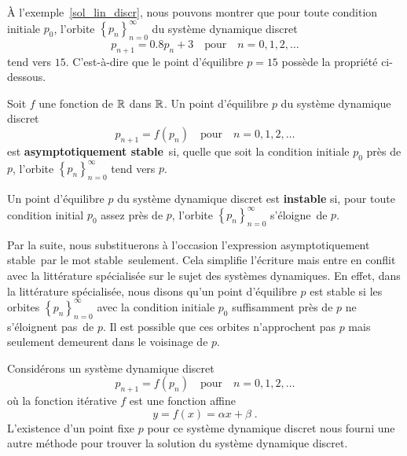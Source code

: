 {\begin{egg}
À l'exemple~\ref{sol_lin_discr}, nous pouvons montrer que pour toute
condition initiale $p_0$, l'orbite
$\displaystyle \left\{ p_n\right\}_{n=0}^\infty$ du 
système dynamique discret
\[
p_{n+1}=0.8 p_n +3 \quad \text{pour} \quad n=0, 1, 2, \ldots
\]
tend vers $15$.  C'est-à-dire que le point d'équilibre $p=15$ possède
la propriété ci-dessous.
\end{egg}

\begin{defn}
Soit $f$ une fonction de $\mathbb{R}$ dans $\mathbb{R}$.  Un point d'équilibre $p$ du
système dynamique discret
\[
p_{n+1} = f(p_n) \quad \text{pour} \quad n=0, 1, 2, \ldots
\]
est {\bfseries asymptotiquement stable}\footnotemark\ si, quelle que soit la
condition initiale $p_0$ près de $p$, l'orbite
$\displaystyle \left\{ p_n\right\}_{n=0}^\infty$ tend vers $p$.

Un point d'équilibre $p$ du système dynamique discret est
{\bfseries instable} si, pour toute condition initial $p_0$ assez près
de $p$, l'orbite $\displaystyle \left\{ p_n\right\}_{n=0}^\infty$
\lgm s'éloigne\rgm\ de $p$.
\end{defn}

\begin{rmk}
Par la suite, nous substituerons à l'occasion l'expression
\lgm asymptotiquement stable\rgm\ par le mot \lgm stable\rgm\
seulement.  Cela simplifie l'écriture mais entre en conflit
avec la littérature spécialisée sur le sujet des systèmes dynamiques.
En effet, dans la littérature spécialisée, nous disons qu'un point
d'équilibre $p$ est stable si les orbites
$\displaystyle \left\{ p_n\right\}_{n=0}^\infty$ avec la condition
initiale $p_0$ suffisamment près de $p$ \lgm ne s'éloignent pas\rgm\
de $p$.  Il est possible que ces orbites n'approchent pas $p$ mais
seulement demeurent dans le voisinage de $p$.  
\end{rmk}

Considérons un système dynamique discret
\[
p_{n+1}=f(p_n) \quad \text{pour} \quad n=0, 1, 2, \ldots
\]
où la fonction itérative $f$ est une fonction affine
\[
y = f(x) = \alpha x + \beta \; .
\]
L'existence d'un point fixe $p$ pour ce système dynamique discret nous
fourni une autre méthode pour trouver la solution du système dynamique
discret.

}

